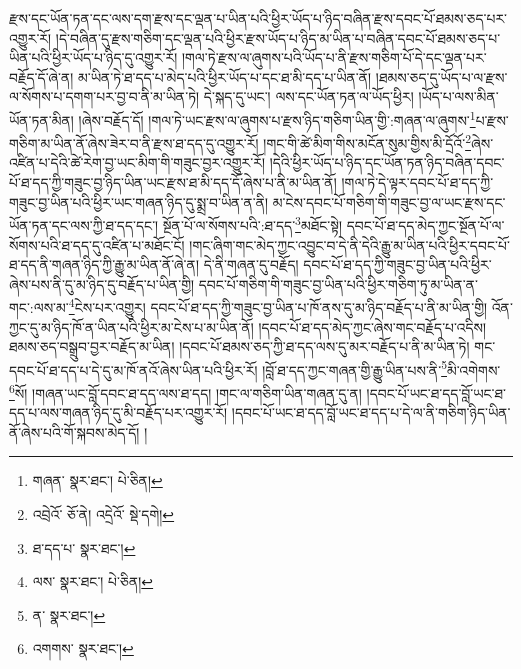 རྫས་དང་ཡོན་ཏན་དང་ལས་དག་རྫས་དང་ལྡན་པ་ཡིན་པའི་ཕྱིར་ཡོད་པ་ཉིད་བཞིན་རྫས་དབང་པོ་ཐམས་ཅད་པར་འགྱུར་རོ། །དེ་བཞིན་དུ་རྫས་གཅིག་དང་ལྡན་པའི་ཕྱིར་རྫས་ཡོད་པ་ཉིད་མ་ཡིན་པ་བཞིན་དབང་པོ་ཐམས་ཅད་པ་ཡིན་པའི་ཕྱིར་ཡོད་པ་ཉིད་དུ་འགྱུར་རོ། །གལ་ཏེ་རྫས་ལ་ཞུགས་པའི་ཡོད་པ་ནི་རྫས་གཅིག་པོ་དེ་དང་ལྡན་པར་བརྗོད་དོ་ཞེ་ན། མ་ཡིན་ཏེ་ཐ་དད་པ་མེད་པའི་ཕྱིར་ཡོད་པ་དང་ཐ་མི་དད་པ་ཡིན་ནོ། །ཐམས་ཅད་དུ་ཡོད་པ་ལ་རྫས་ལ་སོགས་པ་དགག་པར་བྱ་བ་ནི་མ་ཡིན་ཏེ། དེ་སྐད་དུ་ཡང་། ལས་དང་ཡོན་ཏན་ལ་ཡོད་ཕྱིར། །ཡོད་པ་ལས་མིན་ཡོན་ཏན་མིན། །ཞེས་བརྗོད་དོ། །གལ་ཏེ་ཡང་རྫས་ལ་ཞུགས་པ་རྫས་ཉིད་གཅིག་ཡིན་གྱི་:གཞན་ལ་ཞུགས་\footnote{གཞན་  སྣར་ཐང་།  པེ་ཅིན། }པ་རྫས་གཅིག་མ་ཡིན་ནོ་ཞེས་ཟེར་བ་ནི་རྫས་ཐ་དད་དུ་འགྱུར་རོ། །གང་གི་ཚེ་མིག་གིས་མངོན་སུམ་གྱིས་མི་དྲོའོ་\footnote{འབྲེའོ་  ཅོ་ནེ། འདྲེའོ་  སྡེ་དགེ། }ཞེས་འཛིན་པ་དེའི་ཚེ་རེག་བྱ་ཡང་མིག་གི་གཟུང་བྱར་འགྱུར་རོ། །དེའི་ཕྱིར་ཡོད་པ་ཉིད་དང་ཡོན་ཏན་ཉིད་བཞིན་དབང་པོ་ཐ་དད་ཀྱི་གཟུང་བྱ་ཉིད་ཡིན་ཡང་རྫས་ཐ་མི་དད་དོ་ཞེས་པ་ནི་མ་ཡིན་ནོ། །གལ་ཏེ་དེ་ལྟར་དབང་པོ་ཐ་དད་ཀྱི་གཟུང་བྱ་ཡིན་པའི་ཕྱིར་ཡང་གཞན་ཉིད་དུ་སྨྲ་བ་ཡིན་ན་ནི། མ་ངེས་དབང་པོ་གཅིག་གི་གཟུང་བྱ་ལ་ཡང་རྫས་དང་ཡོན་ཏན་དང་ལས་ཀྱི་ཐ་དད་དང་། སྔོན་པོ་ལ་སོགས་པའི་:ཐ་དད་\footnote{ཐ་དད་པ་  སྣར་ཐང་། }མཐོང་སྟེ། དབང་པོ་ཐ་དད་མེད་ཀྱང་སྔོན་པོ་ལ་སོགས་པའི་ཐ་དད་དུ་འཛིན་པ་མཐོང་ངོ། །གང་ཞིག་གང་མེད་ཀྱང་འབྱུང་བ་དེ་ནི་དེའི་རྒྱུ་མ་ཡིན་པའི་ཕྱིར་དབང་པོ་ཐ་དད་ནི་གཞན་ཉིད་ཀྱི་རྒྱུ་མ་ཡིན་ནོ་ཞེ་ན། དེ་ནི་གཞན་དུ་བརྗོད། དབང་པོ་ཐ་དད་ཀྱི་གཟུང་བྱ་ཡིན་པའི་ཕྱིར་ཞེས་པས་ནི་དུ་མ་ཉིད་དུ་བརྗོད་པ་ཡིན་གྱི། དབང་པོ་གཅིག་གི་གཟུང་བྱ་ཡིན་པའི་ཕྱིར་གཅིག་ཏུ་མ་ཡིན་ན་གང་:ལས་མ་\footnote{ལས་  སྣར་ཐང་།  པེ་ཅིན། }ངེས་པར་འགྱུར། དབང་པོ་ཐ་དད་ཀྱི་གཟུང་བྱ་ཡིན་པ་ཁོ་ནས་དུ་མ་ཉིད་བརྗོད་པ་ནི་མ་ཡིན་གྱི། འོན་ཀྱང་དུ་མ་ཉིད་ཁོ་ན་ཡིན་པའི་ཕྱིར་མ་ངེས་པ་མ་ཡིན་ནོ། །དབང་པོ་ཐ་དད་མེད་ཀྱང་ཞེས་གང་བརྗོད་པ་འདིས། ཐམས་ཅད་བསྒྲུབ་བྱར་བརྗོད་མ་ཡིན། །དབང་པོ་ཐམས་ཅད་ཀྱི་ཐ་དད་ལས་དུ་མར་བརྗོད་པ་ནི་མ་ཡིན་ཏེ། གང་དབང་པོ་ཐ་དད་པ་དེ་དུ་མ་ཁོ་ནའོ་ཞེས་ཡིན་པའི་ཕྱིར་རོ། །བློ་ཐ་དད་ཀྱང་གཞན་གྱི་རྒྱུ་ཡིན་པས་ནི་\footnote{ན་  སྣར་ཐང་། }མི་འགེགས་\footnote{འགགས་  སྣར་ཐང་། }སོ། །གཞན་ཡང་བློ་དབང་ཐ་དད་ལས་ཐ་དད། །གང་ལ་གཅིག་ཡིན་གཞན་དུ་ན། །དབང་པོ་ཡང་ཐ་དད་བློ་ཡང་ཐ་དད་པ་ལས་གཞན་ཉིད་དུ་མི་བརྗོད་པར་འགྱུར་རོ། །དབང་པོ་ཡང་ཐ་དད་བློ་ཡང་ཐ་དད་པ་དེ་ལ་ནི་གཅིག་ཉིད་ཡིན་ནོ་ཞེས་པའི་གོ་སྐབས་མེད་དོ། །
